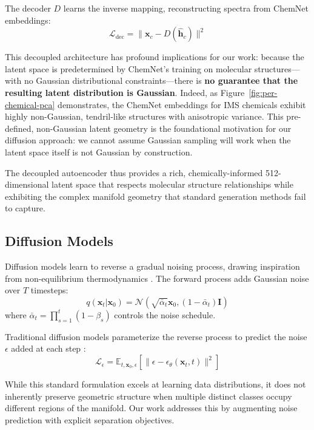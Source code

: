 \documentclass[sigconf]{acmart}
\begin{document}
The decoder $D$ learns the inverse mapping, reconstructing spectra from ChemNet embeddings:
\begin{equation}
\mathcal{L}_{\text{dec}} = \|\mathbf{x}_c - D(\hat{\mathbf{h}}_c)\|^2
\end{equation}

This decoupled architecture has profound implications for our work: because the latent space is predetermined by ChemNet's training on molecular structures—with no Gaussian distributional constraints—there is \textbf{no guarantee that the resulting latent distribution is Gaussian}. Indeed, as Figure~\ref{fig:per-chemical-pca} demonstrates, the ChemNet embeddings for IMS chemicals exhibit highly non-Gaussian, tendril-like structures with anisotropic variance. This pre-defined, non-Gaussian latent geometry is the foundational motivation for our diffusion approach: we cannot assume Gaussian sampling will work when the latent space itself is not Gaussian by construction.

The decoupled autoencoder thus provides a rich, chemically-informed 512-dimensional latent space that respects molecular structure relationships while exhibiting the complex manifold geometry that standard generation methods fail to capture.

\subsection{Diffusion Models}

Diffusion models learn to reverse a gradual noising process, drawing inspiration from non-equilibrium thermodynamics \cite{Sohl-DicksteinW15}. The forward process adds Gaussian noise over $T$ timesteps:
\begin{equation}
q(\mathbf{x}_t | \mathbf{x}_0) = \mathcal{N}(\sqrt{\bar{\alpha}_t}\mathbf{x}_0, (1-\bar{\alpha}_t)\mathbf{I})
\end{equation}
where $\bar{\alpha}_t = \prod_{s=1}^t (1-\beta_s)$ controls the noise schedule.

Traditional diffusion models parameterize the reverse process to predict the noise $\epsilon$ added at each step \cite{Sohl-DicksteinW15, ho2020denoising}:
\begin{equation}
\mathcal{L}_{\epsilon} = \mathbb{E}_{t,\mathbf{x}_0,\epsilon}[\|\epsilon - \epsilon_\theta(\mathbf{x}_t, t)\|^2]
\end{equation}

While this standard formulation excels at learning data distributions, it does not inherently preserve geometric structure when multiple distinct classes occupy different regions of the manifold. Our work addresses this by augmenting noise prediction with explicit separation objectives.
\end{document}
